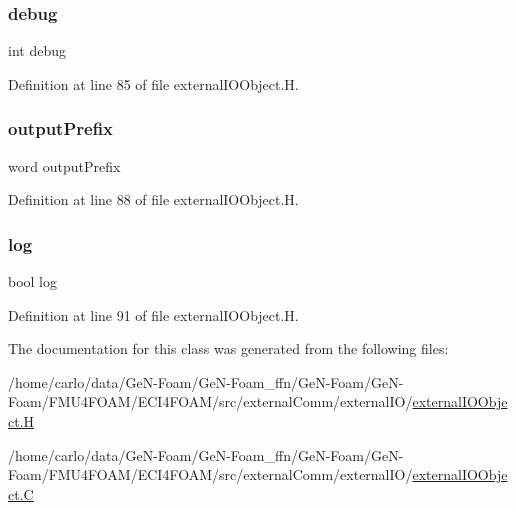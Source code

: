 \subsubsection{\texorpdfstring{debug}{debug}}
{\footnotesize\ttfamily int debug\hspace{0.3cm}{\ttfamily [static]}}



Definition at line 85 of file external\+I\+O\+Object.\+H.

\mbox{\label{classFoam_1_1externalIOObject_1_1externalIOObject_a10f9cf16844cb1df49120a672a6a731a}} 
\subsubsection{\texorpdfstring{output\+Prefix}{outputPrefix}}
{\footnotesize\ttfamily word output\+Prefix\hspace{0.3cm}{\ttfamily [static]}}



Definition at line 88 of file external\+I\+O\+Object.\+H.

\mbox{\label{classFoam_1_1externalIOObject_1_1externalIOObject_ae81d3246bfc238875eaecb9aff755a2e}} 
\subsubsection{\texorpdfstring{log}{log}}
{\footnotesize\ttfamily bool log}



Definition at line 91 of file external\+I\+O\+Object.\+H.



The documentation for this class was generated from the following files\+:\begin{DoxyCompactItemize}
\item 
/home/carlo/data/\+Ge\+N-\/\+Foam/\+Ge\+N-\/\+Foam\+\_\+ffn/\+Ge\+N-\/\+Foam/\+Ge\+N-\/\+Foam/\+F\+M\+U4\+F\+O\+A\+M/\+E\+C\+I4\+F\+O\+A\+M/src/external\+Comm/external\+I\+O/\hyperlink{externalIOObject_8H}{external\+I\+O\+Object.\+H}\item 
/home/carlo/data/\+Ge\+N-\/\+Foam/\+Ge\+N-\/\+Foam\+\_\+ffn/\+Ge\+N-\/\+Foam/\+Ge\+N-\/\+Foam/\+F\+M\+U4\+F\+O\+A\+M/\+E\+C\+I4\+F\+O\+A\+M/src/external\+Comm/external\+I\+O/\hyperlink{externalIOObject_8C}{external\+I\+O\+Object.\+C}\end{DoxyCompactItemize}

